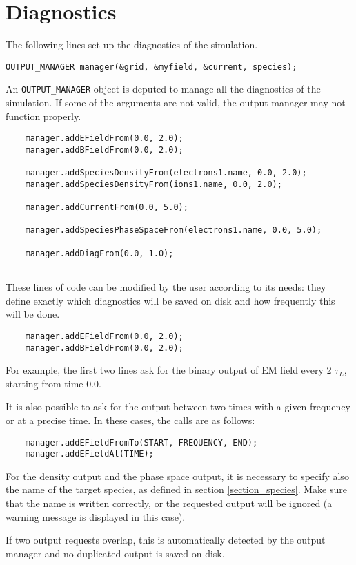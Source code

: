 \documentclass[11pt,a4paper]{report}
\begin{document}
\section{Diagnostics}
The following lines set up the diagnostics of the simulation.
\begin{lstlisting}[backgroundcolor=\color{no_modify}]
	OUTPUT_MANAGER manager(&grid, &myfield, &current, species);
\end{lstlisting}
An \verb+OUTPUT_MANAGER+ object is deputed to manage all the diagnostics of the simulation. If some of the arguments are not valid, the output manager may not function properly.
\begin{lstlisting}
	manager.addEFieldFrom(0.0, 2.0);
	manager.addBFieldFrom(0.0, 2.0);

	manager.addSpeciesDensityFrom(electrons1.name, 0.0, 2.0);
	manager.addSpeciesDensityFrom(ions1.name, 0.0, 2.0);
	
	manager.addCurrentFrom(0.0, 5.0);
	
	manager.addSpeciesPhaseSpaceFrom(electrons1.name, 0.0, 5.0);
	
	manager.addDiagFrom(0.0, 1.0);
	
\end{lstlisting}
These lines of code can be modified by the user according to its needs: they define exactly which diagnostics will be saved on disk and how frequently this will be done.
\begin{lstlisting}
	manager.addEFieldFrom(0.0, 2.0);
	manager.addBFieldFrom(0.0, 2.0);
\end{lstlisting}
For example, the first two lines ask for the binary output of EM field every 2 $\tau_L$, starting from time 0.0.

It is also possible to ask for the output between two times with a given frequency or at a precise time. In these cases, the calls are as follows:
\begin{lstlisting}
	manager.addEFieldFromTo(START, FREQUENCY, END);
	manager.addEFieldAt(TIME);
\end{lstlisting}
For the density output and the phase space output, it is necessary to specify also the name of the target species, as defined in section \ref{section_species}. Make sure that the name is written correctly, or the requested output will be ignored (a warning message is displayed in this case).

If two output requests overlap, this is automatically detected by the output manager and no duplicated output is saved on disk.
\end{document}
